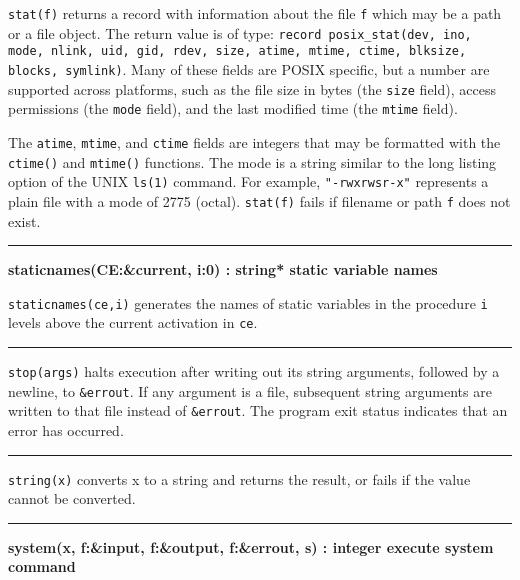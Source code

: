 \noindent
{}\texttt{stat(f)} returns a record
with information about the file \texttt{f} which may be a path or a
file object. The return value is of type: \texttt{record
posix\_stat(dev, ino, mode, nlink, uid, gid, rdev, size, atime, mtime,
ctime, blksize, blocks, symlink)}. Many of these fields are POSIX
specific, but a number are supported across platforms, such as the
file size in bytes (the \texttt{size} field), access
permissions (the \texttt{mode} field), and the last modified time (the
\texttt{mtime} field).

The \texttt{atime}, \texttt{mtime}, and \texttt{ctime} fields are
integers that may be formatted with the \texttt{ctime()} and
\texttt{mtime()} functions. The mode is a string similar to the long
listing option of the UNIX \texttt{ls(1)} command. For example,
\texttt{"-rwxrwsr-x"} represents a plain
file with a mode of 2775 (octal). \texttt{stat(f)} fails if filename or
path \texttt{f} does not exist.

\bigskip\hrule\vspace{0.1cm}
\noindent
{\bf staticnames(CE:\&current, i:0) : string* \hfill static variable names}

\noindent
{}\texttt{staticnames(ce,i)} generates the names of static
variables in the procedure \texttt{i} levels above the current
activation in \texttt{ce}.

\bigskip\hrule\vspace{0.1cm}

\noindent
{}\texttt{stop(args)} halts execution after
writing out its string arguments, followed by a newline, to
\texttt{\&errout}. If any argument is a file, subsequent string
arguments are written to that file instead of \texttt{\&errout}. The
program exit status indicates that an error has occurred.

\bigskip\hrule\vspace{0.1cm}

\noindent
{}\texttt{string(x)} converts x
to a string and returns the result, or fails if the value cannot be
converted.

\bigskip\hrule\vspace{0.1cm}
\noindent
{\bf system(x, f:\&input, f:\&output, f:\&errout, s) : integer \hfill execute system command}

